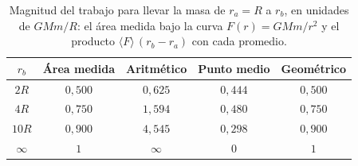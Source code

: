 \documentclass[11pt,a4paper]{book}
\begin{document}
\begin{table}[htbp]
  \centering
  \caption{Magnitud del trabajo para llevar la masa de $r_{a} = R$ a
    $r_{b}$, en unidades de $GMm/R$: el área medida bajo la curva
    $F(r) = GMm/r^{2}$ y el producto $\langle F\rangle\,(r_{b} - r_{a})$ con
    cada promedio.}
  \label{tab:promedios_fuerza}
  \begin{tabular}{@{}ccccc@{}}
    \toprule
    $r_{b}$ & Área medida & Aritmético & Punto medio & Geométrico \\
    \midrule
    $2R$      & $0{,}500$ & $0{,}625$ & $0{,}444$ & $0{,}500$ \\
    $4R$      & $0{,}750$ & $1{,}594$ & $0{,}480$ & $0{,}750$ \\
    $10R$     & $0{,}900$ & $4{,}545$ & $0{,}298$ & $0{,}900$ \\
    $\infty$  & $1$       & $\infty$  & $0$       & $1$       \\
    \bottomrule
  \end{tabular}
\end{table}
\end{document}
